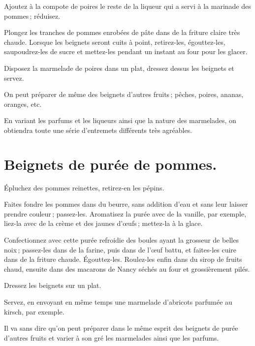 Ajoutez à la compote de poires le reste de la liqueur qui a servi à la marinade
des pommes ; réduisez.

Plongez les tranches de pommes enrobées de pâte dans de la friture claire très
chaude. Lorsque les beignets seront cuits à point, retirez-les, égouttez-les,
saupoudrez-les de sucre et mettez-les pendant un instant au four pour les
glacer.

Disposez la marmelade de poires dans un plat, dressez dessus les beignets et
servez.

\sk

On peut préparer de même des beignets d'autres fruits ; pêches, poires, ananas,
oranges, etc.

En variant les parfums et les liqueurs ainsi que la nature des marmelades, on
obtiendra toute une série d'entremets différents très agréables.

\section*{\centering Beignets de purée de pommes.}
{}

Épluchez des pommes reinettes, retirez-en les pépins.

Faites fondre les pommes dans du beurre, sans addition d'eau et sans leur
laisser prendre couleur ; passez-les. Aromatisez la purée avec de la vanille,
par exemple, liez-la avec de la crème et des jaunes d'œufs ; mettez-la à la
glace.

Confectionnez avec cette purée refroidie des boules ayant la grosseur de belles
noix ; passez-les dans de la farine, puis dans de l'œuf battu, et faites-les
cuire dans de la friture chaude. Égouttez-les. Roulez-les enfin dans du sirop
de fruits chaud, ensuite dans des macarons de Nancy séchés au four et
grossièrement pilés.

Dressez les beignets sur un plat.

Servez, en envoyant en même temps une marmelade d'abricots parfumée au
kirsch, par exemple.

\sk

Il va sans dire qu'on peut préparer dans le même esprit des beignets de purée
d'autres fruits et varier à son gré les marmelades ainsi que les parfums.

